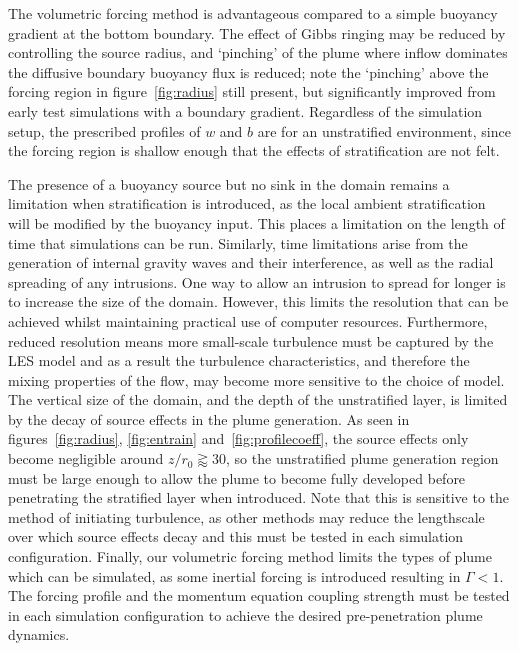 \documentclass[a4paper]{article}
\begin{document}
The volumetric forcing method is advantageous compared to a simple buoyancy gradient at the bottom boundary.
The effect of Gibbs ringing may be reduced by controlling the source radius, and `pinching' of the plume where
inflow dominates the diffusive boundary buoyancy flux is reduced; note the `pinching' above the
forcing region in figure~\ref{fig:radius} still present, but significantly improved from early test
simulations with a boundary gradient. Regardless of the simulation setup, the prescribed profiles of $w$
and $b$ are for an unstratified environment, since the forcing region is shallow enough that the effects of
stratification are not felt.

The presence of a buoyancy source but no sink in the domain remains a limitation when stratification is
introduced, as the local ambient stratification will be modified by the buoyancy input. This
places a limitation on the length of time that simulations can be run. Similarly, time limitations arise from
the generation of internal gravity waves and their interference, as well as the radial spreading of any
intrusions. One way to allow an intrusion to spread for longer is to increase the size of the domain. However,
this limits the resolution that can be achieved whilst maintaining practical use of computer resources.
Furthermore, reduced resolution means more small-scale turbulence must be captured by the LES model and as a
result the turbulence characteristics, and therefore the mixing properties of the flow, may become more
sensitive to the choice of model. The vertical size of the domain, and the depth of the unstratified layer,
is limited by the decay of source effects in the plume generation. As seen in figures~\ref{fig:radius},
\ref{fig:entrain} and~\ref{fig:profilecoeff}, the source effects only become negligible around $z/r_0
\gtrapprox 30$, so the unstratified plume generation region must be large enough to allow the plume to become
fully developed before penetrating the stratified layer when introduced. Note that this is sensitive to the
method of initiating turbulence, as other methods may reduce the lengthscale over which source effects decay
and this must be tested in each simulation configuration. Finally, our volumetric forcing method limits the
types of plume which can be simulated, as some inertial forcing is introduced resulting in $\Gamma < 1$. The
forcing profile and the momentum equation coupling strength must be tested in each simulation configuration to
achieve the desired pre-penetration plume dynamics.


\begin{multicols}{2}
{\small}
\end{multicols}
\end{document}
